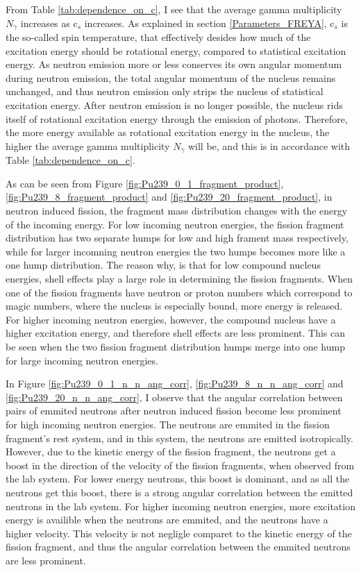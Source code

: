 \documentclass[]{article}
\begin{document}
From Table \ref{tab:dependence_on_c}, I see that the average gamma multiplicity $N_{\gamma}$ increases as c$_s$ increases. As explained in section \ref{Parameters_FREYA}, c$_s$ is the so-called spin temperature, that effectively desides how much of the excitation energy should be rotational energy, compared to statistical excitation energy. As neutron emission more or less conserves its own angular momentum during neutron emission, the total angular momentum of the nucleus remains unchanged, and thus neutron emission only strips the nucleus of statistical excitation energy. After neutron emission is no longer possible, the nucleus rids itself of rotational excitation energy through the emission of photons. Therefore, the more energy available as rotational excitation energy in the nucleus, the higher the average gamma multiplicity $N_{\gamma}$ will be, and this is in accordance with Table \ref{tab:dependence_on_c}.
\par 
\vspace{3mm}

As can be seen from Figure \ref{fig:Pu239_0_1_fragment_product}, \ref{fig:Pu239_8_fragment_product} and \ref{fig:Pu239_20_fragment_product}, in neutron induced fission, the fragment mass distribution changes with the energy of the incoming energy. For low incoming neutron energies, the fission fragment distribution has two separate humps for low and high frament mass respectively, while for larger incomning neutron energies the two humps becomes more like a one hump distribution. The reason why, is that for low compound nucleus energies, shell effects play a large role in determining the fission fragments. When one of the fission fragments have neutron or proton numbers which correspond to magic numbers, where the nucleus is especially bound, more energy is released. For higher incoming neutron energies, however, the compound nucleus have a higher excitation energy, and therefore shell effects are less prominent. This can be seen when the two fission fragment distribution humps merge into one hump for large incoming neutron energies.\par 
\vspace{3mm}

In Figure \ref{fig:Pu239_0_1_n_n_ang_corr}, \ref{fig:Pu239_8_n_n_ang_corr} and \ref{fig:Pu239_20_n_n_ang_corr}, I observe that the angular correlation between pairs of emmited neutrons after neutron induced fission become less prominent for high incoming neutron energies. The neutrons are emmited in the fission fragment's rest system, and in this system, the neutrons are emitted isotropically. However, due to the kinetic energy of the fission fragment, the neutrons get a boost in the direction of the velocity of the fission fragments, when observed from the lab system. For lower energy neutrons, this boost is dominant, and as all the neutrons get this boost, there is a strong angular correlation between the emitted neutrons in the lab system. For higher incoming neutron energies, more excitation energy is availible when the neutrons are emmited, and the neutrons have a higher velocity. This velocity is not negligle comparet to the kinetic energy of the fission fragment, and thus the angular correlation between the emmited neutrons are less prominent.
\end{document}
